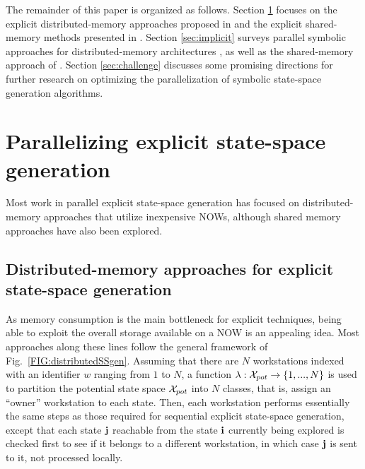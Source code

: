\documentclass[copyright,creativecommons]{eptcs}
\renewcommand{\potxset}{\xset_{pot}}    \renewcommand{\initstate}{\vi_{init}}
\begin{document}
The remainder of this paper is organized as follows.
Section \ref{sec:explicit} focuses on the explicit distributed-memory
approaches proposed in \cite{BarnatASE03,BarnatBR05,Lerda99,Stern97murphi}
and the explicit shared-memory methods presented
in \cite{BarnatBR07,Barnat2008Divine,Inggs2002}.
Section \ref{sec:implicit} surveys parallel symbolic approaches
for distributed-memory architectures
\cite{Arunachalam1996,2004QEST-Distributed,2005PDMC-FirePredict,
Grumberg2005AsynPDSSGEN,Grumberg2003workefficient,Heymann2002fmsd,
Kimura1990,Stornetta1995,Stornetta1996,Yang1997},
as well as the shared-memory approach of \cite{2007CAV-Cilk}.
Section \ref{sec:challenge} discusses some promising directions for further
research on optimizing the parallelization of symbolic state-space
generation algorithms.







\section{Parallelizing explicit state-space generation}
\label{sec:explicit}

Most work in parallel explicit state-space generation has focused on
distributed-memory approaches that utilize inexpensive NOWs, although
shared memory approaches have also been explored.

\subsection{Distributed-memory approaches for explicit state-space generation}
\label{sec:Exp_Distributed}
As memory consumption is the main bottleneck for explicit techniques,
being able to exploit the overall storage available on a NOW is an appealing
idea.
Most approaches along these lines follow the general framework
of Fig.~\ref{FIG:distributedSSgen}.
Assuming that there are $N$ workstations
indexed with an identifier $w$ ranging from $1$ to $N$,
a function $\lambda : \potxset \rightarrow \{1,...,N\}$ is used to partition
the potential state space $\potxset$ into $N$ classes, that is, assign
an ``owner'' workstation to each state.
Then, each workstation performs essentially the same steps as those
required for sequential explicit state-space generation, except that each
state $\mathbf{j}$ reachable from the state $\mathbf{i}$ currently being explored
is checked first to see if it belongs to a different workstation,
in which case $\mathbf{j}$ is sent to it, not processed locally.
\end{document}
